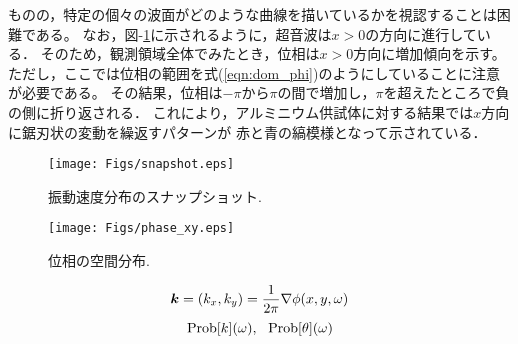 ものの，特定の個々の波面がどのような曲線を描いているかを視認することは困難である。
なお，図-\ref{fig:fig4}に示されるように，超音波は$x>0$の方向に進行している．
そのため，観測領域全体でみたとき，位相は$x>0$方向に増加傾向を示す。
ただし，ここでは位相の範囲を式(\ref{eqn:dom_phi})のようにしていることに注意が必要である。
その結果，位相は$-\pi$から$\pi$の間で増加し，$\pi$を超えたところで負の側に折り返される．
これにより，アルミニウム供試体に対する結果では$x$方向に鋸刃状の変動を繰返すパターンが
赤と青の縞模様となって示されている．
\begin{figure}
\begin{center}
\texttt{[image: Figs/snapshot.eps]}
\caption{
	振動速度分布のスナップショット.
}
\label{fig:fig4}
\end{center}
\end{figure}
\begin{figure}
\begin{center}
	\texttt{[image: Figs/phase\_xy.eps]}
	\caption{位相の空間分布.}
	\label{fig:fig5}
\end{center}
\end{figure}
\begin{equation}
	\fat{k}= (k_x,k_y)= \frac{1}{2\pi} \nabla \phi (x,y,\omega)
	\label{eqn:}
\end{equation}
\begin{equation}
	{\rm Prob} [k](\omega), \ \ 
	{\rm Prob} [\theta](\omega)
	\label{eqn:}
\end{equation}
